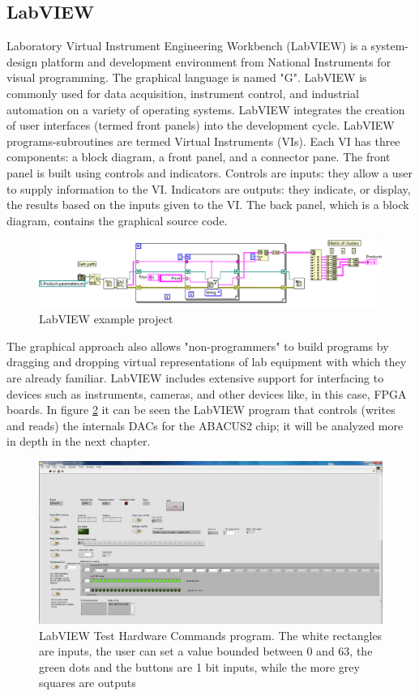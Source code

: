 \subsection{LabVIEW}
\noindent Laboratory Virtual Instrument Engineering Workbench (LabVIEW) is a system-design platform and development environment from National Instruments for visual programming.
The graphical language is named "G". LabVIEW is commonly used for data acquisition, instrument control, and industrial automation on a variety of operating systems.
LabVIEW integrates the creation of user interfaces (termed front panels) into the development cycle. LabVIEW programs-subroutines are termed Virtual Instruments (VIs). Each VI has three components: a block diagram, a front panel, and a connector pane.
The front panel is built using controls and indicators. Controls are inputs: they allow a user to supply information to the VI. Indicators are outputs: they indicate, or display, the results based on the inputs given to the VI. The back panel, which is a block diagram, contains the graphical source code.
\begin{figure}[H]
	\centering
	\includegraphics[width=0.9\linewidth]{IMG/ch3/LABVIEW}
	\caption{LabVIEW example project}
	\label{fig:labview}
\end{figure}
\noindent The graphical approach also allows "non-programmers" to build programs by dragging and dropping virtual representations of lab equipment with which they are already familiar.
\newline
LabVIEW includes extensive support for interfacing to devices such as instruments, cameras, and other devices like, in this case, FPGA boards.
\newline
In figure \ref{fig:labview2} it can be seen the LabVIEW program that controls (writes and reads) the internals DACs for the ABACUS2 chip; it will be analyzed more in depth in the next chapter.
\begin{figure}[H]
	\centering
	\includegraphics[width=0.8\linewidth]{IMG/ch3/LABVIEW2}
	\caption{LabVIEW Test Hardware Commands program. The white rectangles are inputs, the user can set a value bounded between 0 and 63, the green dots and the buttons are 1 bit inputs, while the more grey squares are outputs}
	\label{fig:labview2}
\end{figure}

